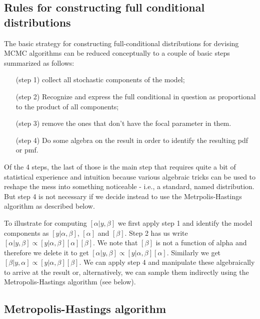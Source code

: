 \subsection{Rules for constructing full conditional distributions}  

The basic strategy for constructing full-conditional distributions for devising MCMC algorithms can be reduced conceptually to a couple of basic steps summarized as follows:
\begin{itemize}
\item[(step 1)] collect all stochastic components of the model; 
\item[(step 2)] Recognize and express the full conditional in question as proportional to the product of all  components; 
\item[(step 3)] remove the ones that don't have the focal parameter in them. 
\item[(step 4)] Do some algebra on the result in order to identify the resulting pdf or pmf. 
\end{itemize}
Of the 4 steps, the last of those is the main step that requires quite a bit of statistical experience and intuition because various algebraic tricks can be used to reshape the mess into something noticeable - i.e., a standard, named distribution. But step 4 is not necessary if we decide instead to use the Metrpolis-Hastings algorithm as described below. 


To illustrate for computing $[\alpha|y,\beta]$ we first apply step 1 and identify the model components as $[y|\alpha, \beta]$, $[\alpha]$ and $[\beta]$. Step 2 has us write $[\alpha|y,\beta] \propto [y|\alpha,\beta][\alpha][\beta]$.  We note that $[\beta]$ is not a function of alpha and therefore we delete it to get $[\alpha|y,\beta] \propto [y|\alpha,\beta][\alpha]$. Similarly we get $[\beta|y,\alpha] \propto [y|\alpha,\beta][\beta]$. We can apply step 4 and manipulate these algebraically to arrive at the result or, alternatively, we can sample them indirectly using the Metropolis-Hastings algorithm (see below).   


\subsection{Metropolis-Hastings algorithm}
 
